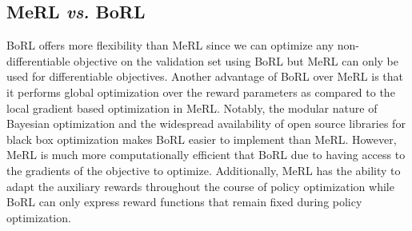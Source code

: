 \subsection{MeRL \textit{vs.} BoRL}
BoRL offers more flexibility than MeRL since we can optimize any
non-differentiable objective on the validation set using BoRL but MeRL can only be used for
differentiable objectives. Another advantage of BoRL over MeRL is that
it performs global optimization over the reward parameters as compared
to the local gradient based optimization in MeRL. Notably, the
modular nature of Bayesian optimization and the
widespread availability of open source libraries for black box
optimization makes BoRL easier to implement than
MeRL. However, MeRL is much more computationally efficient that BoRL
due to having access to the gradients of the objective to
optimize. Additionally, MeRL has the ability to adapt the auxiliary
rewards throughout the course of policy optimization while BoRL can
only express reward functions that remain fixed during policy
optimization.
